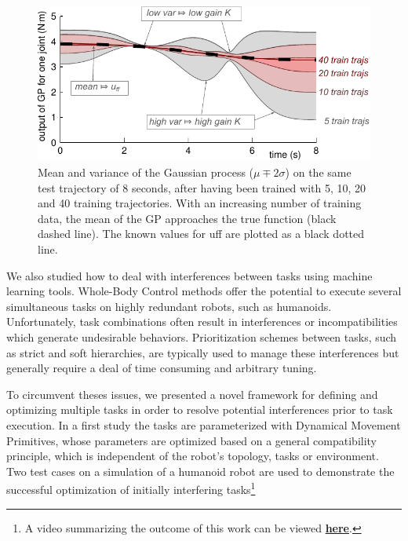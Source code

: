 \documentclass[final,5p,twocolumn]{elsarticle}
\begin{document}
\begin{figure}
  \centering
  \includegraphics[width=\linewidth]{images/meanvariance.pdf}
  \caption{Mean and variance of the Gaussian process ($\mu \mp 2\sigma$) on
    the same test trajectory of 8 seconds, after having been trained with 5,
    10, 20 and 40 training trajectories. With an increasing number of training
    data, the mean of the GP approaches the true function (black dashed
    line). The known values for uff are plotted as a black dotted line.}
  \label{fig:meanvariance}
\end{figure}

We also studied how to deal with interferences between tasks using
machine learning tools. Whole-Body Control methods offer the potential to
execute several simultaneous tasks on highly redundant robots, such as
humanoids. Unfortunately, task combinations often result in interferences or
incompatibilities which generate undesirable behaviors. Prioritization schemes
between tasks, such as strict and soft hierarchies, are typically used to manage
these interferences but generally require a deal of time consuming and arbitrary
tuning.

To circumvent theses issues, we presented a novel framework for defining and
optimizing multiple tasks in order to resolve potential interferences prior to
task execution. In a first study \cite{lober-HUMANOIDS2014} the tasks are
parameterized with Dynamical Movement Primitives, whose parameters are optimized
based on a general compatibility principle, which is independent of the robot's
topology, tasks or environment. Two test cases on a simulation of a humanoid
robot are used to demonstrate the successful optimization of initially
interfering tasks\footnote{A video summarizing the outcome of this work can be viewed
\href{http://pages.isir.upmc.fr/~padois/website/fichiers/videos/lober_Humanoids2014.mp4}{\textbf{here}}.}\\
\end{document}
